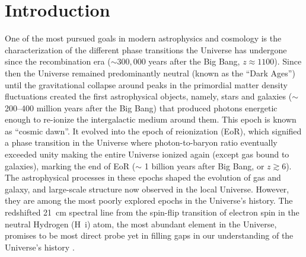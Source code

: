 \documentclass[
reprint,
superscriptaddress,
amsmath,
amssymb,
aps,
prd
]{revtex4-1}
\begin{document}
\pacs{}%


\maketitle


\section{Introduction}\label{sec:intro}

One of the most pursued goals in modern astrophysics and cosmology is the characterization of the different phase transitions the Universe has undergone since the recombination era ($\sim 300,000$ years after the Big Bang, $z\approx 1100$). Since then the Universe remained predominantly neutral (known as the ``Dark Ages'') until the gravitational collapse around peaks in the primordial matter density fluctuations created the first astrophysical objects, namely, stars and galaxies ($\sim$ 200--400 million years after the Big Bang) that produced photons energetic enough to re-ionize the intergalactic medium around them. This epoch is known as ``cosmic dawn''. It evolved into the epoch of reionization (EoR), which signified a phase transition in the Universe where photon-to-baryon ratio eventually exceeded unity making the entire Universe ionized again (except gas bound to galaxies), marking the end of EoR ($\sim$ 1 billion years after Big Bang, or $z\gtrsim 6$). The astrophysical processes in these epochs shaped the evolution of gas and galaxy, and large-scale structure now observed in the local Universe. However, they are among the most poorly explored epochs in the Universe's history. The redshifted 21~cm spectral line from the spin-flip transition of electron spin in the neutral Hydrogen (H~{\sc i}) atom, the most abundant element in the Universe, promises to be most direct probe yet in filling gaps in our understanding of the Universe's history \cite{sun72,sco90,mad97,toz00,ili02,fan02,fan06,bar07,mor10}.
\end{document}
